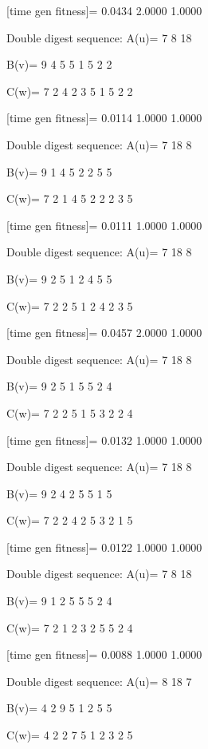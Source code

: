 [time gen fitness]=
    0.0434    2.0000    1.0000

Double digest sequence:
A(u)=
     7     8    18

B(v)=
     9     4     5     5     1     5     2     2

C(w)=
     7     2     4     2     3     5     1     5     2     2

[time gen fitness]=
    0.0114    1.0000    1.0000

Double digest sequence:
A(u)=
     7    18     8

B(v)=
     9     1     4     5     2     2     5     5

C(w)=
     7     2     1     4     5     2     2     2     3     5

[time gen fitness]=
    0.0111    1.0000    1.0000

Double digest sequence:
A(u)=
     7    18     8

B(v)=
     9     2     5     1     2     4     5     5

C(w)=
     7     2     2     5     1     2     4     2     3     5

[time gen fitness]=
    0.0457    2.0000    1.0000

Double digest sequence:
A(u)=
     7    18     8

B(v)=
     9     2     5     1     5     5     2     4

C(w)=
     7     2     2     5     1     5     3     2     2     4

[time gen fitness]=
    0.0132    1.0000    1.0000

Double digest sequence:
A(u)=
     7    18     8

B(v)=
     9     2     4     2     5     5     1     5

C(w)=
     7     2     2     4     2     5     3     2     1     5

[time gen fitness]=
    0.0122    1.0000    1.0000

Double digest sequence:
A(u)=
     7     8    18

B(v)=
     9     1     2     5     5     5     2     4

C(w)=
     7     2     1     2     3     2     5     5     2     4

[time gen fitness]=
    0.0088    1.0000    1.0000

Double digest sequence:
A(u)=
     8    18     7

B(v)=
     4     2     9     5     1     2     5     5

C(w)=
     4     2     2     7     5     1     2     3     2     5


